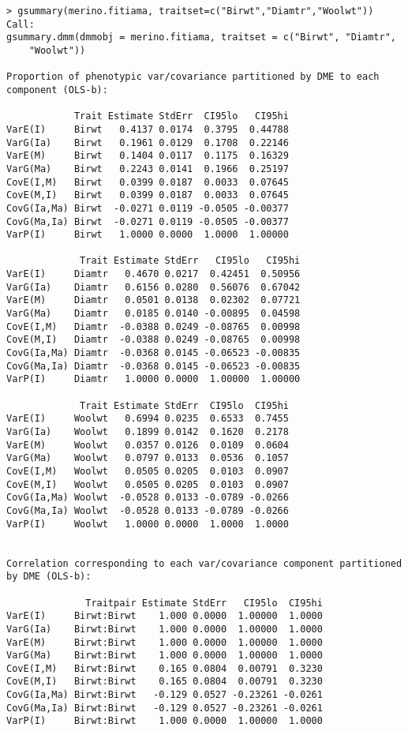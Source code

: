 \documentclass[titlepage]{article}  %
\begin{document}
\begin{verbatim}
> gsummary(merino.fitiama, traitset=c("Birwt","Diamtr","Woolwt"))
Call:
gsummary.dmm(dmmobj = merino.fitiama, traitset = c("Birwt", "Diamtr", 
    "Woolwt"))

Proportion of phenotypic var/covariance partitioned by DME to each component (OLS-b):

            Trait Estimate StdErr  CI95lo   CI95hi
VarE(I)     Birwt   0.4137 0.0174  0.3795  0.44788
VarG(Ia)    Birwt   0.1961 0.0129  0.1708  0.22146
VarE(M)     Birwt   0.1404 0.0117  0.1175  0.16329
VarG(Ma)    Birwt   0.2243 0.0141  0.1966  0.25197
CovE(I,M)   Birwt   0.0399 0.0187  0.0033  0.07645
CovE(M,I)   Birwt   0.0399 0.0187  0.0033  0.07645
CovG(Ia,Ma) Birwt  -0.0271 0.0119 -0.0505 -0.00377
CovG(Ma,Ia) Birwt  -0.0271 0.0119 -0.0505 -0.00377
VarP(I)     Birwt   1.0000 0.0000  1.0000  1.00000

             Trait Estimate StdErr   CI95lo   CI95hi
VarE(I)     Diamtr   0.4670 0.0217  0.42451  0.50956
VarG(Ia)    Diamtr   0.6156 0.0280  0.56076  0.67042
VarE(M)     Diamtr   0.0501 0.0138  0.02302  0.07721
VarG(Ma)    Diamtr   0.0185 0.0140 -0.00895  0.04598
CovE(I,M)   Diamtr  -0.0388 0.0249 -0.08765  0.00998
CovE(M,I)   Diamtr  -0.0388 0.0249 -0.08765  0.00998
CovG(Ia,Ma) Diamtr  -0.0368 0.0145 -0.06523 -0.00835
CovG(Ma,Ia) Diamtr  -0.0368 0.0145 -0.06523 -0.00835
VarP(I)     Diamtr   1.0000 0.0000  1.00000  1.00000

             Trait Estimate StdErr  CI95lo  CI95hi
VarE(I)     Woolwt   0.6994 0.0235  0.6533  0.7455
VarG(Ia)    Woolwt   0.1899 0.0142  0.1620  0.2178
VarE(M)     Woolwt   0.0357 0.0126  0.0109  0.0604
VarG(Ma)    Woolwt   0.0797 0.0133  0.0536  0.1057
CovE(I,M)   Woolwt   0.0505 0.0205  0.0103  0.0907
CovE(M,I)   Woolwt   0.0505 0.0205  0.0103  0.0907
CovG(Ia,Ma) Woolwt  -0.0528 0.0133 -0.0789 -0.0266
CovG(Ma,Ia) Woolwt  -0.0528 0.0133 -0.0789 -0.0266
VarP(I)     Woolwt   1.0000 0.0000  1.0000  1.0000


Correlation corresponding to each var/covariance component partitioned by DME (OLS-b):

              Traitpair Estimate StdErr   CI95lo  CI95hi
VarE(I)     Birwt:Birwt    1.000 0.0000  1.00000  1.0000
VarG(Ia)    Birwt:Birwt    1.000 0.0000  1.00000  1.0000
VarE(M)     Birwt:Birwt    1.000 0.0000  1.00000  1.0000
VarG(Ma)    Birwt:Birwt    1.000 0.0000  1.00000  1.0000
CovE(I,M)   Birwt:Birwt    0.165 0.0804  0.00791  0.3230
CovE(M,I)   Birwt:Birwt    0.165 0.0804  0.00791  0.3230
CovG(Ia,Ma) Birwt:Birwt   -0.129 0.0527 -0.23261 -0.0261
CovG(Ma,Ia) Birwt:Birwt   -0.129 0.0527 -0.23261 -0.0261
VarP(I)     Birwt:Birwt    1.000 0.0000  1.00000  1.0000


\end{verbatim}
\end{document}
